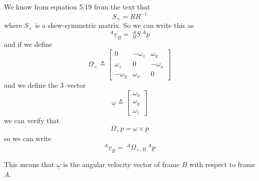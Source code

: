\documentclass[]{article}
\begin{document}
We know from equation 5.19 from the text that
\begin{displaymath}
	S_{\times} = \dot{R}R^{-1}
\end{displaymath}
where $S_{\times}$ is a skew-symmetric matrix. So we can write this as
\begin{displaymath}
	^{A}\underline{v}_{B} = \ ^{A}_{B}S\ ^{A}\underline{p}
\end{displaymath}
and if we define
\begin{displaymath}
	\Omega_{\times} \triangleq \left[ 
	\begin{array}{ccc} 0 & -\omega_{z} & \omega_{y} \\ \omega_{z} & 0 & -\omega_{x} \\ -\omega_{y} & \omega_{x} & 0 \end{array}\right]
\end{displaymath}
and we define the 3--vector
\begin{displaymath}
	\underline{\omega} \triangleq \left[ \begin{array}{c} \omega_{x} \\ \omega_{y} \\ \omega_{z} \end{array} \right]
\end{displaymath}
we can verify that
\begin{displaymath}
	\Omega_{\times}\underline{p}= \omega \times \underline{p}
\end{displaymath}
so we can write
\begin{displaymath}
	^{A}\underline{v}_{B} = \ ^{A}\Omega_{\times,B}\ ^{A}\underline{p}
\end{displaymath}


This means that $\underline{\omega}$ is the angular velocity vector of frame $B$ with respect to frame $A$.
\end{document}
